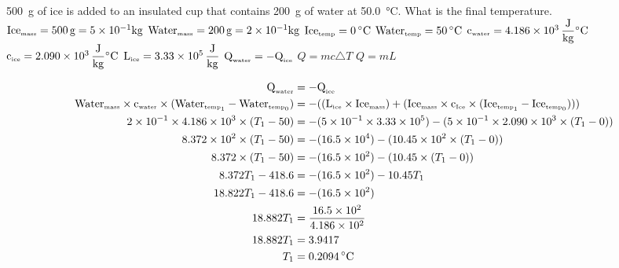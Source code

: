 \documentclass{article}
\begin{document}
\begin{outline}[enumerate]
\newpage






\1 \SI{500}{\gram} of ice is added to an insulated cup that contains \SI{200}{g} of water at \SI{50.0}{\celsius}. What is the final temperature.
	\2 $\mbox{Ice}_{\tiny{\mbox{mass}}} = \SI{500}{\gram} = 5 \times 10^{-1} \SI{}{\kilogram}$
	\2 $\mbox{Water}_{\tiny{\mbox{mass}}} = \SI{200}{\gram} = 2 \times 10^{-1} \SI{}{\kilogram}$
	\2 $\mbox{Ice}_{\tiny{\mbox{temp}}} = \SI{0}{\celsius}$
	\2 $\mbox{Water}_{\tiny{\mbox{temp}}} = \SI{50}{\celsius}$
	\2 $\mbox{c}_{\tiny{\mbox{water}}} = 4.186 \times 10^3  \, \dfrac{\SI{}{\joule}}{\SI{}{\kilogram}}\SI{}{\celsius}$
	\2 $\mbox{c}_{\tiny{\mbox{ice}}} = 2.090 \times 10^3 \, \dfrac{\SI{}{\joule}}{\SI{}{\kilogram}}\SI{}{\celsius}$
	\2 $\mbox{L}_{\tiny{\mbox{ice}}} = 3.33 \times 10^5  \, \dfrac{\SI{}{\joule}}{\SI{}{\kilogram}}$
	\2 $\mbox{Q}_{\tiny{\mbox{water}}} = -\mbox{Q}_{\tiny{\mbox{ice}}}$
	\2 $Q = mc \triangle T$
	\2 $Q = mL $
	
	
\begin{alignat*}{2}
\mbox{Q}_{\tiny{\mbox{water}}} &= -\mbox{Q}_{\tiny{\mbox{ice}}} \\
\mbox{Water}_{\tiny{\mbox{mass}}} \times \mbox{c}_{\tiny{\mbox{water}}} \times (\mbox{Water}_{\mbox{\tiny{temp}}_1} - \mbox{Water}_{\mbox{\tiny{temp}}_0})
&= 
-((\mbox{L}_{\tiny{\mbox{ice}}} \times \mbox{Ice}_{\tiny{\mbox{mass}}}) + 
(\mbox{Ice}_{\tiny{\mbox{mass}}} \times \mbox{c}_{\tiny{\mbox{Ice}}} \times (\mbox{Ice}_{\mbox{\tiny{temp}}_1} - \mbox{Ice}_{\mbox{\tiny{temp}}_0}))) \\
2 \times 10^{-1} \times 4.186 \times 10^3 \times (T_1 - 50) 
&=
-(5 \times 10^{-1} \times 3.33 \times 10^5) -
(5 \times 10^{-1} \times 2.090 \times 10^3 \times (T_1 - 0)) \\
8.372 \times 10^2 \times (T_1 - 50)
&=
-(16.5 \times 10^4) -
(10.45 \times 10^2 \times (T_1 - 0)) \\
8.372 \times (T_1 - 50)
&=
-(16.5 \times 10^2) -
(10.45 \times (T_1 - 0)) \\
8.372T_1 - 418.6
&=
-(16.5 \times 10^2) -
10.45T_1 \\ 
18.822T_1 - 418.6 
&= -(16.5 \times 10^2)\\
18.882T_1 &= \dfrac{16.5 \times 10^2}{4.186 \times 10^2} \\
18.882T_1 &= 3.9417 \\ 
T_1 &= \SI{0.2094}{\celsius}
\end{alignat*}	
	
	
\end{outline}


		
	
	
\end{document}
